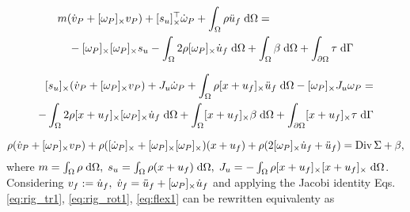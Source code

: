 \begin{equation}
\label{eq:rig_tr1}
\begin{split}
&m (\dot{{v}}_P + \crmat{\omega_P}v_P) + \crmat{s_u}^\top \dot{{\omega}}_P  + \int_{\Omega} \rho \ddot{u}_f \d{\Omega} = \\
&\quad - \crmat{\omega_P} \crmat{\omega_P} {s}_u - \int_{\Omega} 2 \rho \crmat{\omega_P} \dot{u}_f \d{\Omega} +  \int_{\Omega} \beta \d{\Omega} + \int_{\partial \Omega} \tau \d{\Gamma} 
\end{split}
\end{equation}

\begin{equation}
\label{eq:rig_rot1}
\begin{split}
\crmat{s_u} (\dot{{v}}_P + \crmat{\omega_P} v_P) + J_u \dot{\omega}_P + \int_{\Omega} \rho \crmat{x+u_f} \ddot{u}_f \d{\Omega} - \crmat{\omega_P} J_u \omega_P = \\ 
- \int_{\Omega} 2\rho \crmat{x+u_f} \crmat{\omega_P} \dot{u}_f \d{\Omega} + \int_{\Omega}\crmat{x+u_f} \beta \d{\Omega} + \int_{\partial \Omega}\crmat{x+u_f} \tau \d{\Gamma} \\
\end{split}
\end{equation}

\begin{equation}
\label{eq:flex1}
\rho (\dot{{v}}_P + [\omega_P]_{\times} v_P) + \rho ([\dot{\omega}_P]_{\times} + [\omega_P]_{\times}[\omega_P]_{\times})(x + u_f) + \rho (2 [\omega_P]_{\times} \dot{u}_f + \ddot{u}_f) = \operatorname*{Div}{\Sigma} + \beta,
\end{equation}
where $m = \int_{\Omega} \rho \d{\Omega}, \; s_u = \int_{\Omega} \rho (x + u_f) \d{\Omega}, \; J_u= - \int_{\Omega} \rho \crmat{x+u_f}\crmat{x+u_f} \d{\Omega}$. \\
Considering $v_f := \dot{u}_f, \; \dot{v}_f = \ddot{u}_f + [\omega_P]_{\times} \dot{u}_f$ and applying the Jacobi identity Eqs. \eqref{eq:rig_tr1}, \eqref{eq:rig_rot1}, \eqref{eq:flex1} can be rewritten equivalenty as \\

